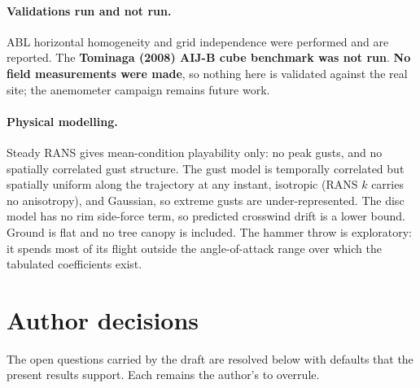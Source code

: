 \documentclass[11pt,letterpaper]{article}
\begin{document}
\paragraph{Validations run and not run.} ABL horizontal homogeneity and grid
independence were performed and are reported. The \textbf{Tominaga (2008) AIJ-B
cube benchmark was not run}. \textbf{No field measurements were made}, so
nothing here is validated against the real site; the anemometer campaign
remains future work.

\paragraph{Physical modelling.} Steady RANS gives mean-condition playability
only: no peak gusts, and no spatially correlated gust structure. The gust model
is temporally correlated but spatially uniform along the trajectory at any
instant, isotropic (RANS $k$ carries no anisotropy), and Gaussian, so extreme
gusts are under-represented. The disc model has no rim side-force term, so
predicted crosswind drift is a lower bound. Ground is flat and no tree canopy is
included. The hammer throw is exploratory: it spends most of its flight outside
the angle-of-attack range over which the tabulated coefficients exist.

\section{Author decisions}
\label{sec:decisions}

The open questions carried by the draft are resolved below with defaults that
the present results support. Each remains the author's to overrule.
\end{document}
